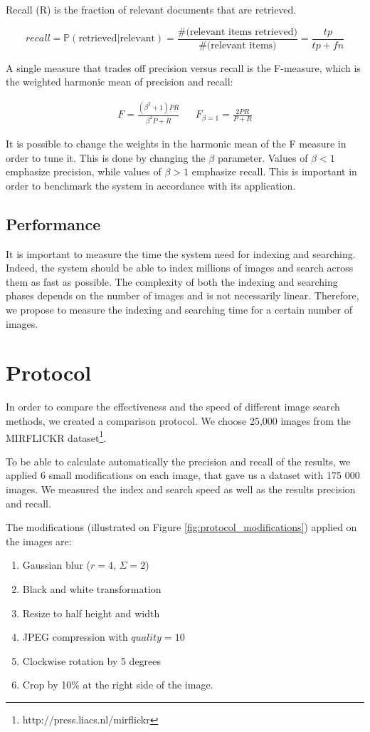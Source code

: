 Recall (R) is the fraction of relevant documents that are retrieved.

\[recall=\mathbb{P}(\text{retrieved}|\text{relevant})=\frac{\text{\#(relevant items retrieved)}}{\text{\#(relevant items)}}=\frac{tp}{tp+fn}\]

A single measure that trades off precision versus recall is the F-measure, which is the weighted harmonic mean of precision and recall: 

\begin{align*}
F=\frac{(\beta^2+1)PR}{\beta^2P+R} && F_{\beta=1}=\frac{2PR}{P+R}
\end{align*}

It is possible to change the weights in the harmonic mean of the F measure in order to tune it. This is done by changing the $\beta$ parameter. Values of $\beta < 1$ emphasize precision, while values of $\beta > 1$ emphasize recall. This is important in order to benchmark the system in accordance with its application.

\subsection{Performance}
It is important to measure the time the system need for indexing and searching. Indeed, the system should be able to index millions of images and search across them as fast as possible. The complexity of both the indexing and searching phases depends on the number of images and is not necessarily linear. Therefore, we propose to measure the indexing and searching time for a certain number of images.

\section{Protocol}
\label{chapter:Benchmarking:section:Protocol}
In order to compare the effectiveness and the speed of different image search methods, we created a comparison protocol. We choose 25,000 images from the MIRFLICKR dataset\footnote{http://press.liacs.nl/mirflickr}.

To be able to calculate automatically the precision and recall of the results, we applied 6 small modifications on each image, that gave us a dataset with 175 000 images. We measured the index and search speed as well as the results precision and recall.

The modifications (illustrated on Figure \ref{fig:protocol_modifications}) applied on the images are: 

\begin{enumerate}
\item Gaussian blur ($r=4$, $\Sigma=2$)
\item Black and white transformation
\item Resize to half height and width
\item JPEG compression with $quality=10$
\item Clockwise rotation by 5 degrees
\item Crop by 10\% at the right side of the image. 
\end{enumerate}


